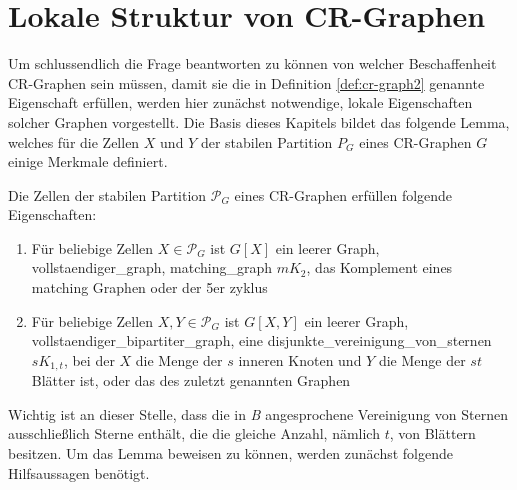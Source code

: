 \section{Lokale Struktur von CR-Graphen}
\label{sec/struktur_lokal}


Um schlussendlich die Frage beantworten zu können von welcher Beschaffenheit CR-Graphen sein müssen, damit sie die in Definition \ref{def:cr-graph2} genannte Eigenschaft erfüllen, werden hier zunächst notwendige, lokale Eigenschaften solcher Graphen vorgestellt.
Die Basis dieses Kapitels bildet das folgende Lemma, welches für die Zellen $X$ und $Y$ der stabilen Partition $P_G$ eines CR-Graphen $G$ einige Merkmale definiert.

\begin{Lemma}
	Die Zellen der stabilen Partition $\mathcal{P}_G$ eines CR-Graphen erfüllen folgende Eigenschaften:
	
	\begin{enumerate}[label=(\Alph*)]
		\item Für beliebige Zellen $X\in \mathcal{P}_G$ ist $G[X]$ ein leerer Graph, \gls{vollstaendiger_graph}, \gls{matching_graph} $mK_2$, das Komplement eines matching Graphen oder der 5er \gls{zyklus}
		\item Für beliebige Zellen $X,Y\in \mathcal{P}_G$ ist $G[X,Y]$ ein leerer Graph, \gls{vollstaendiger_bipartiter_graph}, eine \gls{disjunkte_vereinigung_von_sternen} $sK_{1,t}$, bei der $X$ die Menge der $s$ inneren Knoten und $Y$ die Menge der $st$ Blätter ist, oder das  des zuletzt genannten Graphen
	\end{enumerate}
	\label{lemma:lokal}
\end{Lemma}

Wichtig ist an dieser Stelle, dass die in \emph{B} angesprochene Vereinigung von Sternen ausschließlich Sterne enthält, die die gleiche Anzahl, nämlich $t$, von Blättern besitzen.
Um das Lemma beweisen zu können, werden zunächst folgende Hilfsaussagen benötigt.

